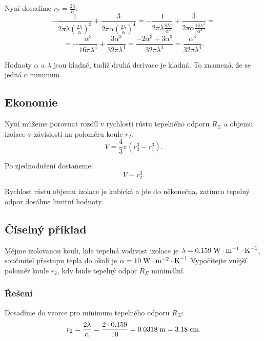 \documentclass{article}
\begin{document}
Nyní dosadíme $r_2 = \frac{2 \lambda}{\alpha}$:
$$
    -\frac{1}{2 \pi \lambda \left( \frac{2 \lambda}{\alpha} \right)^3} + \frac{3}{2 \pi \alpha \left( \frac{2 \lambda}{\alpha} \right)^4} = -\frac{1}{2 \pi \lambda \frac{8 \lambda^3}{\alpha^3}} + \frac{3}{2 \pi \alpha \frac{16 \lambda^4}{\alpha^4}} =
$$
$$
    = -\frac{\alpha^3}{16 \pi \lambda^4} + \frac{3 \alpha^3}{32 \pi \lambda^4} = \frac{-2 \alpha^3 + 3 \alpha^3}{32 \pi \lambda^4} = \frac{\alpha^3}{32 \pi \lambda^4}.
$$

Hodnoty $\alpha$ a $\lambda$ jsou kladné, tudíž druhá derivace je kladná. To znamená, že se jedná o minimum.

\begin{center}
\end{center}


\subsection{Ekonomie}

Nyní můžeme porovnat rozdíl v rychlosti růstu tepelného odporu $R_\Sigma$ a objemu izolace v závislosti na poloměru koule $r_2$.
$$
    V = \frac{4}{3} \pi (r_2^3 - r_1^3).
$$

Po zjednodušení dostaneme:
$$
    V \sim r_2^3.
$$

Rychlost růstu objemu izolace je kubická a jde do někonečna, zatímco tepelný odpor dosáhne limitní hodnoty.


\subsection{Číselný příklad}
Mějme izolovanou kouli, kde tepelná vodivost izolace je $\lambda = 0.159 \; \textrm{W} \cdot \textrm{m}^{-1} \cdot \textrm{K}^{-1}$, součinitel přestupu tepla do okolí je $\alpha = 10 \; \textrm{W} \cdot \textrm{m}^{-2} \cdot \textrm{K}^{-1}$ Vypočítejte vnější poloměr koule $r_2$, kdy bude tepelný odpor $R_\Sigma$ minimální.

\subsubsection{Řešení}
Dosadíme do vzorce pro minimum tepelného odporu $R_\Sigma$:
$$
    r_2 = \frac{2 \lambda}{\alpha} = \frac{2 \cdot 0.159}{10} = 0.0318 \; \textrm{m} = 3.18 \; \textrm{cm}.
$$
\end{document}
